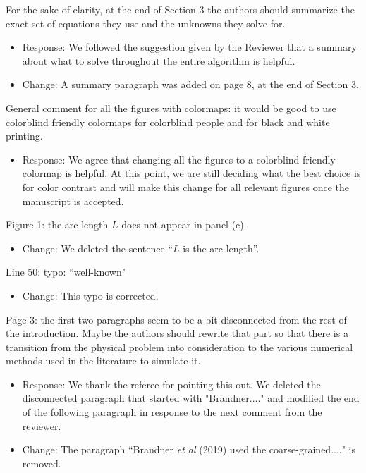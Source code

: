 \documentclass[11pt]{article}
\newcommand{\comment}[1]{{\color{blue} #1}}
\begin{document}
\noindent
\comment{For the sake of clarity, at the end of Section 3 the authors
should summarize the exact set of equations they use and the unknowns
they solve for.}
\begin{itemize}
\item Response: We followed the suggestion given by the
  Reviewer that a summary about what to solve throughout the entire algorithm is helpful. 
  \item Change: A summary paragraph was added on page 8, at the end of Section 3.
\end{itemize}

\noindent
\comment{General comment for all the figures with colormaps: it would be
good to use colorblind friendly colormaps for colorblind people and for
black and white printing.}
\begin{itemize}
\item Response: We agree that changing all the figures 
  to a colorblind friendly colormap is helpful.  At this point,
  we are still deciding what the best choice is for color
  contrast and will make this change for all relevant figures once the
  manuscript is accepted.
\end{itemize}

\noindent
\comment{Figure 1: the arc length $L$ does not appear in panel (c).}
\begin{itemize}
  \item Change: We deleted the sentence ``$L$ is the arc length''.
\end{itemize}

\noindent
\comment{Line 50: typo: ``well-known"}
\begin{itemize}
  \item Change: This typo is corrected.
\end{itemize}

\noindent
\comment{Page 3: the first two paragraphs seem to be a bit disconnected
from the rest of the introduction. Maybe the authors should rewrite that
part so that there is a transition from the physical problem into
consideration to the various numerical methods used in the literature to
simulate it.}
\begin{itemize}
 \item Response: We thank the referee for pointing this out. We deleted the disconnected paragraph that started with "Brandner...." and modified the end of the following paragraph in response to the next comment from the reviewer.
  \item Change: The paragraph ``Brandner {\it et al} (2019) used the coarse-grained...." is removed.
\end{itemize}
\end{document}
